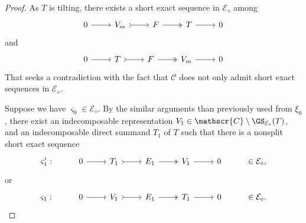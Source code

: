 \begin{proof}
As $T$ is tilting, there exists a short exact sequence in $\mathcal{E}_\diamond$ among 
\[\begin{tikzcd}
	 0 & V_m & F & T &  0 
	\arrow[from=1-1, to=1-2]
	\arrow[tail, from=1-2, to=1-3]
	\arrow[two heads,from=1-3, to=1-4]
	\arrow[from=1-4, to=1-5]
\end{tikzcd}\] and \[\begin{tikzcd}
	 0 & T & F & V_m &  0 
	\arrow[from=1-1, to=1-2]
	\arrow[tail, from=1-2, to=1-3]
	\arrow[two heads,from=1-3, to=1-4]
	\arrow[from=1-4, to=1-5]
\end{tikzcd}\] That seeks a contradiction with the fact that $\mathscr{C}$ does not only admit short exact sequences in $\mathcal{E}_\diamond$.

Suppose we have $\varsigma_0 \in \mathcal{E}_\diamond$. By the similar arguments than previously used from $\xi_0$, there exist an indecomposable representation $V_1 \in \mathscr{C} \setminus \GS_{\mathcal{E}_\diamond}(T)$, and an indecomposable direct summand $T_1$ of $T$ such that there is a nonsplit short exact sequence  \[\begin{tikzcd}
	\varsigma_1': & 0 & T_1 & E_1 & V_1 &  0 & \in \mathcal{E}_\diamond,
	\arrow[from=1-2, to=1-3]
	\arrow[tail, from=1-3, to=1-4]
	\arrow[two heads,from=1-4, to=1-5]
	\arrow[from=1-5, to=1-6]
\end{tikzcd}\]  or \[\begin{tikzcd}
	\varsigma_1: & 0 & V_1 & E_1 & T_1 &  0 & \in \mathcal{E}_\diamond.
	\arrow[from=1-2, to=1-3]
	\arrow[tail, from=1-3, to=1-4]
	\arrow[two heads,from=1-4, to=1-5]
	\arrow[from=1-5, to=1-6]
\end{tikzcd}\] 


\end{proof}
